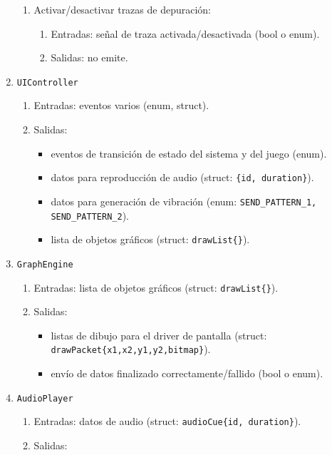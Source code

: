 \documentclass[11pt,a4paper]{article}
\begin{document}
\begin{enumerate}
\begin{enumerate}
      \item Activar/desactivar trazas de depuración:
      \begin{enumerate}
        \item Entradas: señal de traza activada/desactivada (bool o enum).
        \item Salidas: no emite.
      \end{enumerate}
    \end{enumerate}
  \item \texttt{UIController}
    \begin{enumerate}
      \item Entradas: eventos varios (enum, struct).
      \item Salidas: 
      \begin{itemize}
        \item eventos de transición de estado del sistema y del juego (enum).
        \item datos para reproducción de audio (struct: \texttt{\{id, duration\}}).
        \item datos para generación de vibración (enum: \texttt{SEND\_PATTERN\_1, SEND\_PATTERN\_2}).
        \item lista de objetos gráficos (struct: \texttt{drawList\{\}}).
      \end{itemize}
    \end{enumerate}
  \item \texttt{GraphEngine}
    \begin{enumerate}
        \item Entradas: lista de objetos gráficos (struct: \texttt{drawList\{\}}).
        \item Salidas: 
        \begin{itemize}
          \item listas de dibujo para el driver de pantalla (struct: \texttt{drawPacket\{x1,x2,y1,y2,bitmap\}}).
          \item envío de datos finalizado correctamente/fallido (bool o enum).
        \end{itemize}
    \end{enumerate}
  \item \texttt{AudioPlayer}
    \begin{enumerate}
      \item Entradas: datos de audio (struct: \texttt{audioCue\{id, duration\}}).
      \item Salidas: 

\end{enumerate}
\end{enumerate}
\end{document}
